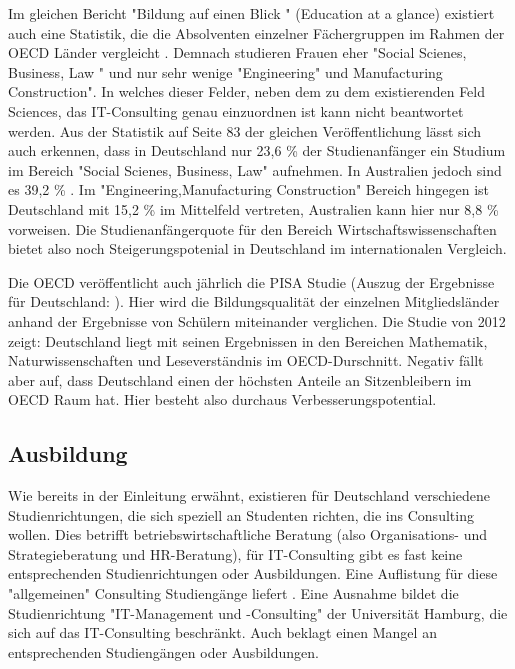 Im gleichen Bericht "Bildung auf einen Blick " (Education at a glance) existiert auch eine Statistik, die die Absolventen einzelner Fächergruppen im Rahmen der OECD Länder vergleicht \cite{oecd3}. Demnach studieren Frauen eher "Social Scienes, Business, Law " und nur sehr wenige "Engineering" und Manufacturing Construction". In welches dieser Felder, neben dem  zu dem existierenden Feld Sciences, das IT-Consulting genau einzuordnen ist kann nicht beantwortet werden. Aus der Statistik auf Seite 83 der gleichen Veröffentlichung lässt sich auch erkennen, dass in Deutschland nur 23,6 \% der Studienanfänger ein Studium im Bereich "Social Scienes, Business, Law" aufnehmen. In Australien jedoch sind es 39,2 \% . Im "Engineering,Manufacturing Construction" Bereich hingegen ist Deutschland mit 15,2 \% im Mittelfeld vertreten, Australien kann hier nur  8,8 \% vorweisen. Die Studienanfängerquote für den Bereich Wirtschaftswissenschaften bietet also noch Steigerungspotenial in Deutschland im internationalen Vergleich.

Die OECD veröffentlicht auch jährlich die PISA Studie (Auszug der Ergebnisse für Deutschland: \cite{pisa} ). Hier wird die Bildungsqualität der einzelnen Mitgliedsländer anhand der Ergebnisse von Schülern miteinander verglichen. Die Studie von 2012 zeigt: Deutschland liegt mit seinen Ergebnissen in den Bereichen Mathematik, Naturwissenschaften und Leseverständnis im OECD-Durschnitt. Negativ fällt aber auf, dass Deutschland einen der höchsten Anteile an Sitzenbleibern im OECD Raum hat. Hier besteht also durchaus Verbesserungspotential.

\subsection{Ausbildung}
Wie bereits in der Einleitung erwähnt, existieren für Deutschland verschiedene Studienrichtungen, die sich speziell an Studenten richten, die ins Consulting wollen. Dies betrifft betriebswirtschaftliche Beratung (also Organisations- und Strategieberatung und HR-Beratung), für IT-Consulting gibt es fast keine entsprechenden Studienrichtungen oder Ausbildungen.
Eine Auflistung für diese "allgemeinen" Consulting Studiengänge liefert \cite{NissenKlaukDeelmannMohe201209}. 
Eine Ausnahme bildet die Studienrichtung "IT-Management und -Consulting" der Universität Hamburg, die sich auf das IT-Consulting beschränkt. Auch \cite{IDSScheer} beklagt einen Mangel an entsprechenden Studiengängen oder Ausbildungen.

